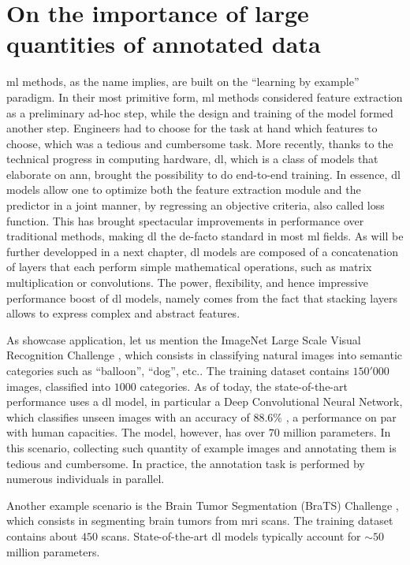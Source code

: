 \section{On the importance of large quantities of annotated data}
\Gls{ml} methods, as the name implies, are built on the ``learning by example'' paradigm.
In their most primitive form, \gls{ml} methods considered feature extraction as a preliminary ad-hoc step, while the design and training of the model formed another step.
Engineers had to choose for the task at hand which features to choose, which was a tedious and cumbersome task.
More recently, thanks to the technical progress in computing hardware, \gls{dl}, which is a class of models that elaborate on \gls{ann}, brought the possibility to do end-to-end training.
In essence, \gls{dl} models allow one to optimize both the feature extraction module and the predictor in a joint manner, by regressing an objective criteria, also called loss function.
This has brought spectacular improvements in performance over traditional methods, making \gls{dl} the de-facto standard in most \gls{ml} fields.
As will be further developped in a next chapter, \gls{dl} models are composed of a concatenation of layers that each perform simple mathematical operations, such as matrix multiplication or convolutions.
The power, flexibility, and hence impressive performance boost of \gls{dl} models, namely comes from the fact that stacking layers allows to express complex and abstract features.

As showcase application, let us mention the ImageNet Large Scale Visual Recognition Challenge \cite{ILSVRC15}, which consists in classifying natural images into semantic categories such as ``balloon'', ``dog'', etc..
The training dataset contains $150'000$ images, classified into $1000$ categories.
As of today, the state-of-the-art performance uses a \gls{dl} model, in particular a Deep Convolutional Neural Network, which classifies unseen images with an accuracy of $88.6\%$ \cite{tan19}, a performance on par with human capacities.
The model, however, has over $70$ million parameters.
In this scenario, collecting such quantity of example images and annotating them is tedious and cumbersome.
In practice, the annotation task is performed by numerous individuals in parallel.

Another example scenario is the Brain Tumor Segmentation (BraTS) Challenge \cite{menze15}, which consists in segmenting brain tumors from \gls{mri} scans.
The training dataset contains about $450$ scans.
State-of-the-art \gls{dl} models typically account for $\sim 50$ million parameters.

